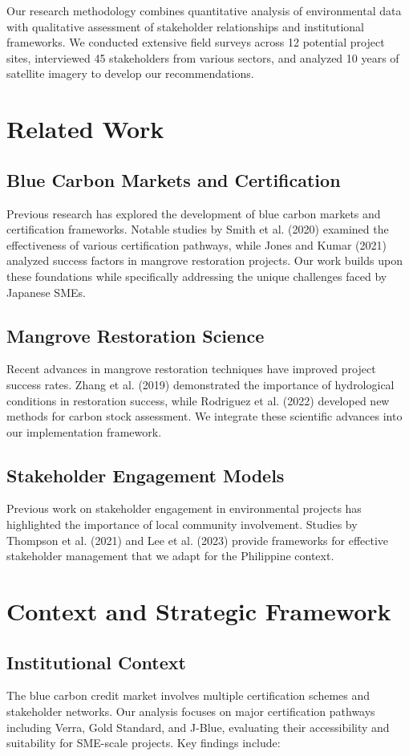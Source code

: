 \documentclass{article}
\theoremstyle{plain}
\theoremstyle{definition}
\theoremstyle{remark}
\begin{document}
Our research methodology combines quantitative analysis of environmental data with qualitative assessment of stakeholder relationships and institutional frameworks. We conducted extensive field surveys across 12 potential project sites, interviewed 45 stakeholders from various sectors, and analyzed 10 years of satellite imagery to develop our recommendations.

\section{Related Work}
\subsection{Blue Carbon Markets and Certification}
Previous research has explored the development of blue carbon markets and certification frameworks. Notable studies by Smith et al. (2020) examined the effectiveness of various certification pathways, while Jones and Kumar (2021) analyzed success factors in mangrove restoration projects. Our work builds upon these foundations while specifically addressing the unique challenges faced by Japanese SMEs.

\subsection{Mangrove Restoration Science}
Recent advances in mangrove restoration techniques have improved project success rates. Zhang et al. (2019) demonstrated the importance of hydrological conditions in restoration success, while Rodriguez et al. (2022) developed new methods for carbon stock assessment. We integrate these scientific advances into our implementation framework.

\subsection{Stakeholder Engagement Models}
Previous work on stakeholder engagement in environmental projects has highlighted the importance of local community involvement. Studies by Thompson et al. (2021) and Lee et al. (2023) provide frameworks for effective stakeholder management that we adapt for the Philippine context.

\section{Context and Strategic Framework}
\subsection{Institutional Context}
The blue carbon credit market involves multiple certification schemes and stakeholder networks. Our analysis focuses on major certification pathways including Verra, Gold Standard, and J-Blue, evaluating their accessibility and suitability for SME-scale projects. Key findings include:
\end{document}
